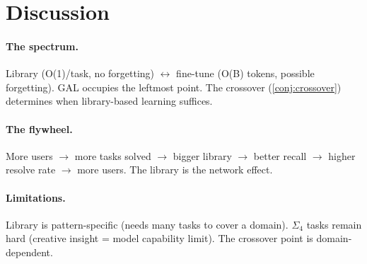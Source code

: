 \documentclass{article}
\begin{document}
\section{Discussion}\label{sec:discussion}

\paragraph{The spectrum.}
Library (O(1)/task, no forgetting) $\leftrightarrow$
fine-tune (O(B) tokens, possible forgetting).
GAL occupies the leftmost point.
The crossover (\cref{conj:crossover}) determines when
library-based learning suffices.

\paragraph{The flywheel.}
More users $\to$ more tasks solved $\to$ bigger library
$\to$ better recall $\to$ higher resolve rate $\to$
more users.  The library is the network effect.

\paragraph{Limitations.}
Library is pattern-specific (needs many tasks to cover a
domain).  $\Sigma_4$ tasks remain hard (creative insight =
model capability limit).  The crossover point is
domain-dependent.




\end{document}
